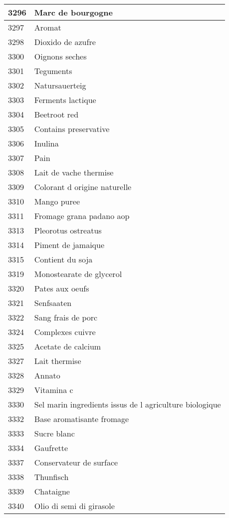\begin{longtable}{|l|l|}
3296 & Marc de bourgogne \\ \hline 
3297 & Aromat \\ \hline 
3298 & Dioxido de azufre \\ \hline 
3300 & Oignons seches \\ \hline 
3301 & Teguments \\ \hline 
3302 & Natursauerteig \\ \hline 
3303 & Ferments lactique \\ \hline 
3304 & Beetroot red \\ \hline 
3305 & Contains preservative \\ \hline 
3306 & Inulina \\ \hline 
3307 & Pain \\ \hline 
3308 & Lait de vache thermise \\ \hline 
3309 & Colorant d origine naturelle \\ \hline 
3310 & Mango puree \\ \hline 
3311 & Fromage grana padano aop \\ \hline 
3313 & Pleorotus ostreatus \\ \hline 
3314 & Piment de jamaique \\ \hline 
3315 & Contient du soja \\ \hline 
3319 & Monostearate de glycerol \\ \hline 
3320 & Pates aux oeufs \\ \hline 
3321 & Senfsaaten \\ \hline 
3322 & Sang frais de porc \\ \hline 
3324 & Complexes cuivre \\ \hline 
3325 & Acetate de calcium \\ \hline 
3327 & Lait thermise \\ \hline 
3328 & Annato \\ \hline 
3329 & Vitamina c \\ \hline 
3330 & Sel marin  ingredients issus de l agriculture biologique \\ \hline 
3332 & Base aromatisante fromage \\ \hline 
3333 & Sucre blanc \\ \hline 
3334 & Gaufrette \\ \hline 
3337 & Conservateur de surface \\ \hline 
3338 & Thunfisch \\ \hline 
3339 & Chataigne \\ \hline 
3340 & Olio di semi di girasole \\ \hline 

\end{longtable}
